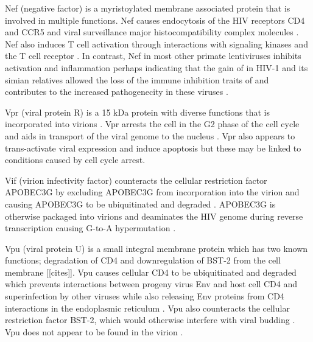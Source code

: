 \documentclass[../sherrill-Mix_thesis.tex]{subfiles}
\begin{document}
\begin{description}
				Nef (negative factor) is a myristoylated membrane associated protein \citep{Yu1992} that is involved in multiple functions. Nef causes endocytosis of the HIV receptors CD4 \citep{Garcia1991,Benson1993,Aiken1994,Lama1999,Ross1999} and CCR5 \citep{Michel2005} and viral surveillance major histocompatibility complex molecules \citep{Schwartz1996,Collins1998,Stumptner-Cuvelette2001,Blagoveshchenskaya2002}. Nef also induces T cell activation through interactions with signaling kinases and the T cell receptor \citep{Xu1999,Schrager1999,Wang2000,Simmons2001,Schrager2002}. In contrast, Nef in most other primate lentiviruses inhibits activation and inflammation \citep{Schindler2006} perhaps indicating that the gain of \vpu{} in HIV-1 and its simian relatives allowed the loss of the immune inhibition traits of \nef{} and contributes to the increased pathogenecity in these viruses \citep{Kirchhoff2008,Kirchhoff2009}.
		\item[\vpr{}]
			Vpr (viral protein R) is a 15 kDa protein \citep{Wong-Staal1987,Cohen1990} with diverse functions that is incorporated into virions \citep{Cohen1990a,Yuan1990}. Vpr arrests the cell in the G2 phase of the cell cycle \citep{Jowett1995,Re1995,He1995,Rogel1995,Noronha2001} and aids in transport of the viral genome to the nucleus \citep{Heinzinger1994}. Vpr also appears to trans-activate viral expression \citep{Goh1998,Subbramanian1998} and induce apoptosis \citep{Stewart1997,Shostak1999} but these may be linked to conditions caused by cell cycle arrest.
		\item[\vif{}]
			Vif (virion infectivity factor) counteracts the cellular restriction factor APOBEC3G \citep{Sheehy2002} by excluding APOBEC3G from incorporation into the virion \citep{Mariani2003} and causing APOBEC3G to be ubiquitinated and degraded \citep{Sheehy2003,Marin2003,Yu2003}. APOBEC3G is otherwise packaged into virions \citep{Harris2003} and deaminates the HIV genome during reverse transcription causing G-to-A hypermutation \citep{Harris2003,Mangeat2003,Zhang2003,Lecossier2003}.
		\item[\vpu{}]
			Vpu (viral protein U) \citep{Cohen1988,Strebel1988} is a small integral membrane protein which has two known functions; degradation of CD4 and downregulation of BST-2 from the cell membrane [[cites]]. Vpu causes cellular CD4 to be ubiquitinated and degraded \citep{Willey1992,Bour1995} which prevents interactions between progeny virus Env and host cell CD4 \citep{Marshall1992,Lama1999,Ross1999,Cortes2002} and superinfection by other viruses \citep{Benson1993}  while also releasing Env proteins from CD4 interactions in the endoplasmic reticulum \citep{Crise1990,Bour1991}. Vpu also counteracts the cellular restriction factor BST-2, which would otherwise interfere with viral budding \citep{Neil2008}. Vpu does not appear to be found in the virion \citep{Strebel1989}.
	\end{description}
\end{document}
